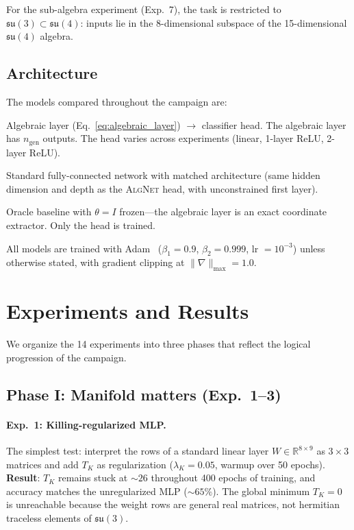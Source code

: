 \documentclass[11pt,a4paper]{article}
\newcommand{\fksu}{\mathfrak{su}}
\newcommand{\RR}{\mathbb{R}}
\newcommand{\TK}{T_K}
\newcommand{\ngen}{n_{\mathrm{gen}}}
\newcommand{\AlgNet}{\textsc{AlgNet}}
\newcommand{\GMLFixed}{\textsc{GML-Fixed}}
\theoremstyle{definition}
\begin{document}
For the sub-algebra experiment (Exp.~7), the task is restricted to 
$\fksu(3) \subset \fksu(4)$: inputs lie in the 8-dimensional subspace of 
the 15-dimensional $\fksu(4)$ algebra.

\subsection{Architecture}
\label{sec:architecture}

The models compared throughout the campaign are:

\begin{description}[nosep]
  \item[\AlgNet{}:] Algebraic layer (Eq.~\ref{eq:algebraic_layer}) 
    $\to$ classifier head. The algebraic layer has $\ngen$ outputs. 
    The head varies across experiments (linear, 1-layer ReLU, 
    2-layer ReLU).
  \item[MLP:] Standard fully-connected network with matched 
    architecture (same hidden dimension and depth as the \AlgNet{} 
    head, with unconstrained first layer).
  \item[\GMLFixed{}:] Oracle baseline with $\theta = I$ frozen---the 
    algebraic layer is an exact coordinate extractor. Only the 
    head is trained.
\end{description}

All models are trained with Adam~\cite{kingma2015adam} 
($\beta_1 = 0.9$, $\beta_2 = 0.999$, lr $= 10^{-3}$) unless 
otherwise stated, with gradient clipping at $\|\nabla\|_{\max} = 1.0$.


\section{Experiments and Results}
\label{sec:experiments}

We organize the 14 experiments into three phases that reflect the logical 
progression of the campaign.


\subsection{Phase I: Manifold matters (Exp.~1--3)}
\label{sec:phase1}

\paragraph{Exp.~1: Killing-regularized MLP.}
The simplest test: interpret the rows of a standard linear layer 
$W \in \RR^{8 \times 9}$ as $3\times 3$ matrices and add $\TK$ as 
regularization ($\lambda_K = 0.05$, warmup over 50 epochs). 
\textbf{Result}: $\TK$ remains stuck at $\sim 26$ throughout 400 epochs 
of training, and accuracy matches the unregularized MLP ($\sim 65\%$). 
The global minimum $\TK = 0$ is unreachable because the weight rows are 
general real matrices, not hermitian traceless elements of $\fksu(3)$.
\end{document}

